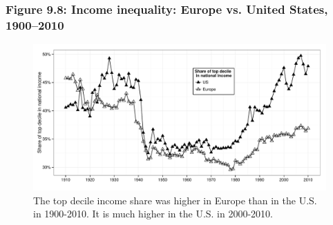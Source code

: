 \documentclass[t]{beamer}\usepackage[]{graphicx}\usepackage[]{color}
\newenvironment{knitrout}{}{} %
\begin{document}
\begin{frame}[label=Figure_9_8]
\frametitle{Figure 9.8: Income inequality: Europe vs. United States, 1900--2010}
\begin{figure}[t]
\begin{minipage}[b]{\textwidth}
\centering
\begin{knitrout}\footnotesize
{}\color{fgcolor}

{\centering \includegraphics[width=1\linewidth]{figures/bw/Figure_9_8} 

}



\end{knitrout}
\caption{The top decile income share was higher in Europe than in the U.S. in 1900-2010. It is much higher in the U.S. in 2000-2010.}
\end{minipage}
\end{figure}
\end{frame}
\end{document}
